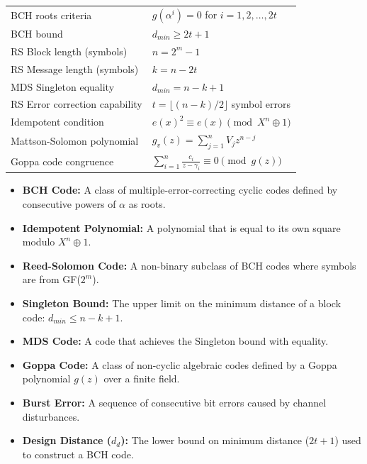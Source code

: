 \documentclass[12pt,a4paper]{article}
\renewcommand{\arraystretch}{1.45}
\begin{document}
\begin{tcolorbox}[formulabox, title={\textbf{Key Formulas and Metrics at a Glance}}]
\renewcommand{\arraystretch}{1.35}
\begin{tabularx}{\linewidth}{B{5.0cm} X}
BCH roots criteria & $g(\alpha^i) = 0$ for $i = 1, 2, \dots, 2t$ \\[4pt]
BCH bound & $d_{min} \ge 2t + 1$ \\[4pt]
RS Block length (symbols) & $n = 2^m - 1$ \\[4pt]
RS Message length (symbols) & $k = n - 2t$ \\[4pt]
MDS Singleton equality & $d_{min} = n - k + 1$ \\[4pt]
RS Error correction capability & $t = \lfloor (n-k)/2 \rfloor$ symbol errors \\[4pt]
Idempotent condition & $e(x)^2 \equiv e(x) \pmod{X^n \oplus 1}$ \\[4pt]
Mattson-Solomon polynomial & $g_v(z) = \sum_{j=1}^n V_j z^{n-j}$ \\[4pt]
Goppa code congruence & $\sum_{i=1}^n \frac{c_i}{z - \gamma_i} \equiv 0 \pmod{g(z)}$
\end{tabularx}
\end{tcolorbox}

\vspace{6pt}

\begin{tcolorbox}[defbox, title={\textbf{One-Line Definitions}}]
\begin{itemize}[leftmargin=*, itemsep=3pt, topsep=0pt]
  \item \textbf{BCH Code:} A class of multiple-error-correcting cyclic codes defined by consecutive powers of $\alpha$ as roots.
  \item \textbf{Idempotent Polynomial:} A polynomial that is equal to its own square modulo $X^n \oplus 1$.
  \item \textbf{Reed-Solomon Code:} A non-binary subclass of BCH codes where symbols are from GF($2^m$).
  \item \textbf{Singleton Bound:} The upper limit on the minimum distance of a block code: $d_{min} \le n - k + 1$.
  \item \textbf{MDS Code:} A code that achieves the Singleton bound with equality.
  \item \textbf{Goppa Code:} A class of non-cyclic algebraic codes defined by a Goppa polynomial $g(z)$ over a finite field.
  \item \textbf{Burst Error:} A sequence of consecutive bit errors caused by channel disturbances.
  \item \textbf{Design Distance ($d_d$):} The lower bound on minimum distance ($2t+1$) used to construct a BCH code.
\end{itemize}
\end{tcolorbox}
\end{document}
